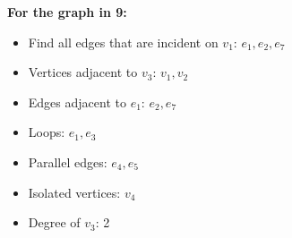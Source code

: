 \documentclass[a4paper, 10pt]{article}
\begin{document}
    \textbf{For the graph in 9:}
    \begin{itemize}
        \item Find all edges that are incident on \( v_1 \): \( e_1, e_2, e_7 \)
        \item Vertices adjacent to \( v_3 \): \( v_1, v_2 \)
        \item Edges adjacent to \( e_1 \): \( e_2, e_7 \)
        \item Loops: \( e_1, e_3 \)
        \item Parallel edges: \( e_4, e_5 \)
        \item Isolated vertices: \( v_4 \)
        \item Degree of \( v_3 \): 2
    \end{itemize}
\end{document}
